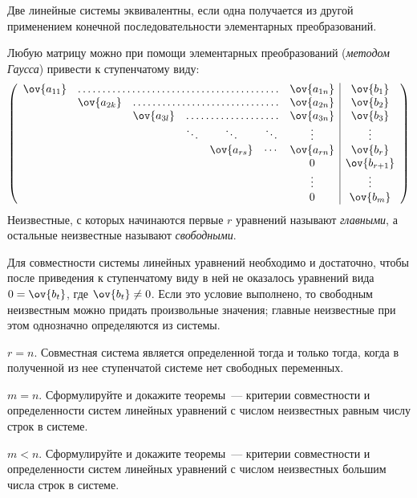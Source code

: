 \begin{problems}

\item
Две линейные системы эквивалентны, если одна получается из другой применением
конечной последовательности элементарных преобразований.

\item
Любую матрицу можно при помощи элементарных преобразований
(\emph{методом Гаусса}) привести к ступенчатому виду:\pagebreak[0]
\[
\left(\begin{array}{ccccccc|c}
    \ov{a_{11}} & \hdotsfor{5} & \ov{a_{1n}} & \ov{b_1}
\\
    & \ov{a_{2k}} & \hdotsfor{4} & \ov{a_{2n}} & \ov{b_2}
\\
    & & \ov{a_{3l}} & \hdotsfor{3} & \ov{a_{3n}} & \ov{b_3}
\\
    & & & \ddots & \ddots & \ddots & \vdots & \vdots
\\
    & & & & \ov{a_{rs}} & \cdots & \ov{a_{rn}} & \ov{b_r}
\\
    & & & & & & 0 & \ov{b_{r+1}}
\\
    & & & & & & \vdots & \vdots
\\
    & & & & & & 0 & \ov{b_{m}}
\end{array}\right)
\]
Неизвестные, с которых начинаются первые $r$ уравнений называют
\emph{главными}, а остальные неизвестные называют \emph{свободными}.

\item
Для совместности системы линейных уравнений необходимо и достаточно, чтобы
после приведения к ступенчатому виду в ней не оказалось уравнений вида
$0 = \ov{b_t}$, где $\ov{b_t} \not= 0$.
Если это условие выполнено, то свободным неизвестным можно придать произвольные
значения;
главные неизвестные при этом однозначно определяются из системы.

\item
$r = n$.
Совместная система является определенной тогда и только тогда, когда в
полученной из нее ступенчатой системе нет свободных переменных.

\item
$m = n$.
Сформулируйте и докажите теоремы~--- критерии совместности и определенности
систем линейных уравнений с числом неизвестных равным числу строк в системе.

\item
$m < n$.
Сформулируйте и докажите теоремы~--- критерии совместности и определенности
систем линейных уравнений с числом неизвестных большим числа строк в системе.


\end{problems}
